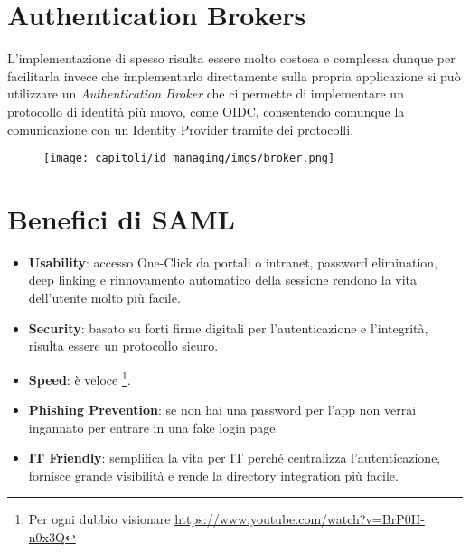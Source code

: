 \section{Authentication Brokers}

L'implementazione di \saml{} spesso risulta essere molto costosa e complessa dunque
per facilitarla invece che implementarlo direttamente sulla propria applicazione
si può utilizzare un \textit{Authentication Broker} che ci permette
di implementare
un protocollo di identità più nuovo, come OIDC, consentendo comunque la
comunicazione con un Identity Provider tramite dei protocolli.

\begin{figure}[H]
      \centering
      \texttt{[image: capitoli/id\_managing/imgs/broker.png]}
\end{figure}

\section{Benefici di SAML}

\begin{itemize}
      \item \textbf{Usability}: accesso One-Click da portali o intranet, password
            elimination, deep linking e rinnovamento automatico della sessione
            rendono la vita dell'utente molto più facile.
      \item \textbf{Security}: basato su forti firme digitali per l'autenticazione
            e l'integrità, \saml{} risulta essere un protocollo sicuro.
      \item \textbf{Speed}: \saml{} è veloce \footnote{Per ogni dubbio visionare \url{https://www.youtube.com/watch?v=BrP0H-n0x3Q}}.
      \item \textbf{Phishing Prevention}: se non hai una password per l'app non
            verrai ingannato per entrare in una fake login page.
      \item \textbf{IT Friendly}: \saml{} semplifica la vita per IT perché centralizza
            l'autenticazione, fornisce grande visibilità e rende la
            directory integration
            più facile.
\end{itemize}